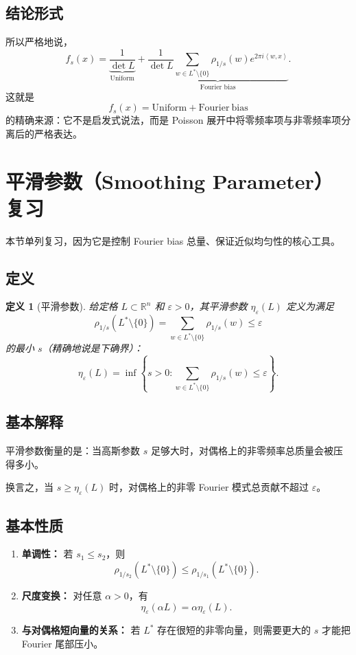 \documentclass[12pt,a4paper]{ctexart}
\newtheorem{definition}{定义}[section]
\newcommand{\R}{\mathbb{R}}
\newcommand{\eps}{\varepsilon}
\newcommand{\dual}{^{*}}
\newcommand{\ip}[2]{\left\langle #1,#2\right\rangle}
\begin{document}
\subsection{结论形式}

所以严格地说，
\[
f_s(x)
=
\underbrace{\frac{1}{\det L}}_{\text{Uniform}}
+
\underbrace{
\frac{1}{\det L}\sum_{w\in L\dual\setminus\{0\}}
\rho_{1/s}(w)e^{2\pi i\ip{w}{x}}
}_{\text{Fourier bias}}.
\]
这就是
\[
f_s(x)=\mathrm{Uniform}+\mathrm{Fourier\ bias}
\]
的精确来源：它不是启发式说法，而是 Poisson 展开中将零频率项与非零频率项分离后的严格表达。

\section{平滑参数（Smoothing Parameter）复习}

本节单列复习，因为它是控制 Fourier bias 总量、保证近似均匀性的核心工具。

\subsection{定义}

\begin{definition}[平滑参数]
给定格 \(L\subset \R^n\) 和 \(\eps>0\)，其平滑参数 \(\eta_\eps(L)\) 定义为满足
\[
\rho_{1/s}(L\dual\setminus\{0\})=\sum_{w\in L\dual\setminus\{0\}} \rho_{1/s}(w)\le \eps
\]
的最小 \(s\)（精确地说是下确界）：
\[
\eta_\eps(L)
=
\inf\left\{
s>0:
\sum_{w\in L\dual\setminus\{0\}}\rho_{1/s}(w)\le \eps
\right\}.
\]
\end{definition}

\subsection{基本解释}

平滑参数衡量的是：当高斯参数 \(s\) 足够大时，对偶格上的非零频率总质量会被压得多小。

换言之，当 \(s\ge \eta_\eps(L)\) 时，对偶格上的非零 Fourier 模式总贡献不超过 \(\eps\)。

\subsection{基本性质}

\begin{enumerate}[label=\arabic*.]
    \item \textbf{单调性：} 若 \(s_1\le s_2\)，则
    \[
    \rho_{1/s_2}(L\dual\setminus\{0\})\le \rho_{1/s_1}(L\dual\setminus\{0\}).
    \]
    \item \textbf{尺度变换：} 对任意 \(\alpha>0\)，有
    \[
    \eta_\eps(\alpha L)=\alpha \eta_\eps(L).
    \]
    \item \textbf{与对偶格短向量的关系：} 若 \(L\dual\) 存在很短的非零向量，则需要更大的 \(s\) 才能把 Fourier 尾部压小。
\end{enumerate}
\end{document}
